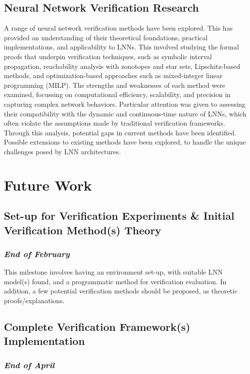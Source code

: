\subsection*{Neural Network Verification Research}

A range of neural network verification methods have been explored. This has provided an understanding of their theoretical foundations, practical implementations, and applicability to LNNs. This involved studying the formal proofs that underpin verification techniques, such as symbolic interval propagation, reachability analysis with zonotopes and star sets, Lipschitz-based methods, and optimization-based approaches such as mixed-integer linear programming (MILP). The strengths and weaknesses of each method were examined, focussing on computational efficiency, scalability, and precision in capturing complex network behaviors. Particular attention was given to assessing their compatibility with the dynamic and continuous-time nature of LNNs, which often violate the assumptions made by traditional verification frameworks. Through this analysis, potential gaps in current methods have been identified. Possible extensions to existing methods have been explored, to handle the unique challenges posed by LNN architectures.

\section{Future Work}

\subsection*{Set-up for Verification Experiments \& Initial Verification Method(s) Theory}
\subsubsection*{\textit{End of February}}

This milestone involves having an environment set-up, with suitable LNN model(s) found, and a programmatic method for verification evaluation. In addition, a few potential verification methods should be proposed, as theoretic proofs/explanations.

\subsection*{Complete Verification Framework(s) Implementation}
\subsubsection*{\textit{End of April}}


